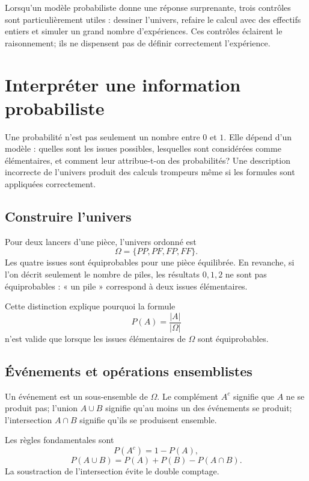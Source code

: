 \documentclass[12pt,a4paper,openany]{book}
\newcommand{\abs}[1]{\left\lvert #1\right\rvert}
\begin{document}
\begin{visualbox}
Lorsqu'un modèle probabiliste donne une réponse surprenante, trois contrôles sont particulièrement utiles : dessiner l'univers, refaire le calcul avec des effectifs entiers et simuler un grand nombre d'expériences. Ces contrôles éclairent le raisonnement; ils ne dispensent pas de définir correctement l'expérience.
\end{visualbox}


\section{Interpréter une information probabiliste}

Une probabilité n'est pas seulement un nombre entre $0$ et $1$. Elle dépend d'un modèle : quelles sont les issues possibles, lesquelles sont considérées comme élémentaires, et comment leur attribue-t-on des probabilités? Une description incorrecte de l'univers produit des calculs trompeurs même si les formules sont appliquées correctement.

\subsection{Construire l'univers}

Pour deux lancers d'une pièce, l'univers ordonné est
\[
\Omega=\{PP,PF,FP,FF\}.
\]
Les quatre issues sont équiprobables pour une pièce équilibrée. En revanche, si l'on décrit seulement le nombre de piles, les résultats $0,1,2$ ne sont pas équiprobables : « un pile » correspond à deux issues élémentaires.

Cette distinction explique pourquoi la formule
\[
P(A)=\frac{\abs A}{\abs\Omega}
\]
n'est valide que lorsque les issues élémentaires de $\Omega$ sont équiprobables.

\subsection{Événements et opérations ensemblistes}

Un événement est un sous-ensemble de $\Omega$. Le complément $A^c$ signifie que $A$ ne se produit pas; l'union $A\cup B$ signifie qu'au moins un des événements se produit; l'intersection $A\cap B$ signifie qu'ils se produisent ensemble.

Les règles fondamentales sont
\[
P(A^c)=1-P(A),
\]
\[
P(A\cup B)=P(A)+P(B)-P(A\cap B).
\]
La soustraction de l'intersection évite le double comptage.
\end{document}
